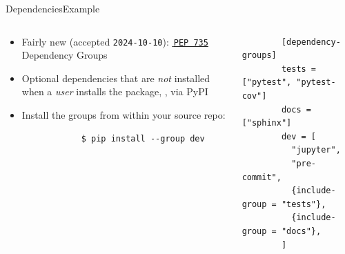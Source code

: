 \begin{splitframe}[fragile]{Dependencies}{Example}
  \vspace{1em}
  \begin{columns}[t,onlytextwidth]
    \begin{column}{0.58\textwidth}
      \begin{itemize}
        \setlength{\itemsep}{1em}
        \item Fairly new (accepted \texttt{2024-10-10}): \href{https://peps.python.org/pep-0735/}{{\footnotesize{\faExternalLink*}}\,\texttt{PEP 735}} Dependency Groups
        \item Optional dependencies that are \emph{not} installed when a \emph{user} installs the package, \eg, via PyPI
        \item Install the groups from within your source repo:
          \begin{verbatim}
            $ pip install --group dev
          \end{verbatim}
      \end{itemize}
    \end{column}
    \hfill
    \begin{column}{0.38\textwidth}
      \begin{verbatim}
        [dependency-groups]
        tests = ["pytest", "pytest-cov"]
        docs = ["sphinx"]
        dev = [
          "jupyter",
          "pre-commit",
          {include-group = "tests"},
          {include-group = "docs"},
        ]
      \end{verbatim}
    \end{column}
  \end{columns}
\end{splitframe}


